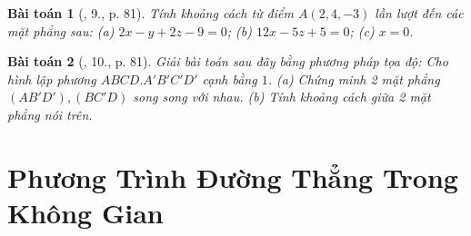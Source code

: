 \documentclass{article}
\newtheorem{baitoan}{Bài toán}
\begin{document}
\begin{baitoan}[\cite{SGK_Toan_12_hinh_hoc_co_ban}, 9., p. 81]
	Tính khoảng cách từ điểm $A(2,4,-3)$ lần lượt đến các mặt phẳng sau: (a) $2x - y + 2z - 9 = 0$; (b) $12x - 5z + 5 = 0$; (c) $x = 0$.
\end{baitoan}

\begin{baitoan}[\cite{SGK_Toan_12_hinh_hoc_co_ban}, 10., p. 81]
	Giải bài toán sau đây bằng phương pháp tọa độ: Cho hình lập phương $ABCD.A'B'C'D'$ cạnh bằng $1$. (a) Chứng minh 2 mặt phẳng $(AB'D'),(BC'D)$ song song với nhau. (b) Tính khoảng cách giữa 2 mặt phẳng nói trên.
\end{baitoan}


\section{Phương Trình Đường Thẳng Trong Không Gian}


\printbibliography[heading=bibintoc]
	
\end{document}
